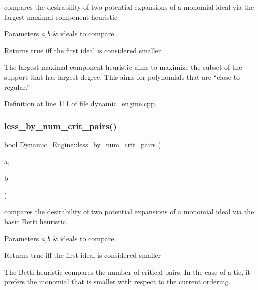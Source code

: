 compares the desirability of two potential expansions of a monomial ideal via the largest maximal component heuristic 


\begin{DoxyParams}{Parameters}
{\em a,b} & ideals to compare \\
\hline
\end{DoxyParams}
\begin{DoxyReturn}{Returns}
{\ttfamily true} iff the first ideal is considered smaller
\end{DoxyReturn}
The largest maximal component heuristic aims to maximize the subset of the support that has largest degree. This aims for polynomials that are ``close to regular.'' 

Definition at line 111 of file dynamic\+\_\+engine.\+cpp.

\mbox{\label{namespace_dynamic___engine_ab4b77c648c1c2892cffba4dcf2a6d80a}} 
\subsubsection{\texorpdfstring{less\+\_\+by\+\_\+num\+\_\+crit\+\_\+pairs()}{less\_by\_num\_crit\_pairs()}}
{\footnotesize\ttfamily bool Dynamic\+\_\+\+Engine\+::less\+\_\+by\+\_\+num\+\_\+crit\+\_\+pairs (\begin{DoxyParamCaption}\item[{\hyperlink{group___g_b_computation_class_dynamic___engine_1_1_p_p___with___ideal}{P\+P\+\_\+\+With\+\_\+\+Ideal} \&}]{a,  }\item[{\hyperlink{group___g_b_computation_class_dynamic___engine_1_1_p_p___with___ideal}{P\+P\+\_\+\+With\+\_\+\+Ideal} \&}]{b }\end{DoxyParamCaption})}



compares the desirability of two potential expansions of a monomial ideal via the basic Betti heuristic 


\begin{DoxyParams}{Parameters}
{\em a,b} & ideals to compare \\
\hline
\end{DoxyParams}
\begin{DoxyReturn}{Returns}
{\ttfamily true} iff the first ideal is considered smaller
\end{DoxyReturn}
The Betti heuristic compares the number of critical pairs. In the case of a tie, it prefers the monomial that is smaller with respect to the current ordering. 

